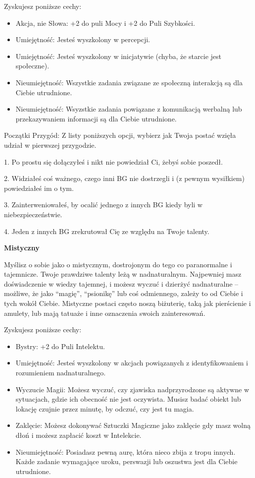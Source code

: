 Zyskujesz poniższe cechy:
\begin{itemize}
\item Akcja, nie Słowa: +2 do puli Mocy i +2 do Puli Szybkości.
\item Umiejętność: Jesteś wyszkolony w percepcji.
\item  Umiejętność: Jesteś wyszkolony w inicjatywie (chyba, że starcie jest społeczne).
\item  Nieumiejętność: Wszystkie zadania związane ze społeczną interakcją są dla Ciebie utrudnione.
\item  Nieumiejętność: Wsyzstkie zadania powiązane z komunikacją werbalną lub przekazywaniem informacji są dla Ciebie utrudnione.
\end{itemize}

Początki Przygód: Z listy poniższych opcji, wybierz jak Twoja postać wzięła udział w pierwszej przygodzie.

1. Po prostu się dołączyłeś i nikt nie powiedział Ci, żebyś sobie poszedł.

2. Widziałeś coś ważnego, czego inni BG nie dostrzegli i (z pewnym wysiłkiem) powiedziałeś im o tym.

3. Zainterweniowałeś, by ocalić jednego z innych BG kiedy byli w niebezpieczeństwie.

4. Jeden z innych BG zrekrutował Cię ze względu na Twoje talenty.

\textbf{Mistyczny}

Myślisz o sobie jako o mistycznym, dostrojonym do tego co paranormalne i tajemnicze. Twoje prawdziwe talenty leżą w nadnaturalnym.  Najpewniej masz doświadczenie w wiedzy tajemnej, i możesz wyczuć i dzierżyć nadnaturalne – możliwe, że jako “magię”, “psionikę” lub coś odmiennego, zależy to od Ciebie i tych wokół Ciebie. Mistyczne postaci często noszą biżuterię, taką jak pierścienie i amulety, lub mają tatuaże i inne oznaczenia swoich zainteresowań.

Zyskujesz poniższe cechy:
\begin{itemize}
\item  Bystry: +2 do Puli Intelektu.
\item  Umiejętność: Jesteś wyszkolony w akcjach powiązanych z identyfikowaniem i rozumieniem nadnaturalnego.
\item  Wyczucie Magii: Możesz wyczuć, czy zjawiska nadprzyrodzone są aktywne w sytuacjach, gdzie ich obecność nie jest oczywista. Musisz badać obiekt lub lokację czujnie przez minutę, by odczuć, czy jest tu magia. 
\item  Zaklęcie: Możesz dokonywać Sztuczki Magiczne jako zaklęcie gdy masz wolną dłoń i możesz zapłacić koszt w Intelekcie. 
 \item Nieumiejętność: Posiadasz pewną aurę, która nieco zbija z tropu innych. Każde zadanie wymagające uroku, perswazji lub oszustwa jest dla Ciebie utrudnione. 
\end{itemize}

